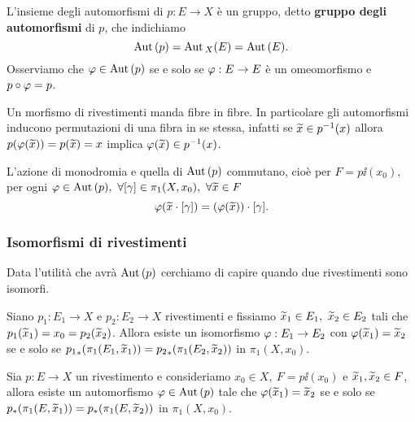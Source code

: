 \begin{multicols*}{2}
\begin{definition}
L'insieme degli automorfismi di $p:E\to X$ \`e un gruppo, detto \textbf{gruppo degli automorfismi} di $p$, che indichiamo
\[\mathrm{Aut}\,(p)=\mathrm{Aut}\,_X(E)=\mathrm{Aut}\,(E).\]
Osserviamo che $\varphi\in \mathrm{Aut}\,(p)$ se e solo se $\varphi:E\to E$ \`e un omeomorfismo e $p\circ \varphi=p$.
\end{definition}
\begin{remark}
Un morfismo di rivestimenti manda fibre in fibre. In particolare gli automorfismi inducono permutazioni di una fibra in se stessa, infatti se $\widetilde{x}\in p^{-1}(x)$ allora $p(\varphi(\widetilde{x}))=p(\widetilde{x})=x$ implica $\varphi(\widetilde{x})\in p^{-1}(x)$.
\end{remark}

\begin{proposition}\label{AzioneDiAutomorfismiEMonodromiaCommutano}
L'azione di monodromia e quella di $\mathrm{Aut}\,(p)$ commutano, cio\`e per $F=p\ii(x_0)$, per ogni $\varphi\in \mathrm{Aut}\,(p),\ \forall [\gamma]\in\pi_1(X,x_0),\ \forall \widetilde{x}\in F$
\[\varphi(\widetilde{x}\cdot[\gamma])=(\varphi(\widetilde{x}))\cdot [\gamma].\]
\end{proposition}


\subsubsection{Isomorfismi di rivestimenti}
Data l'utilit\`a che avr\`a $\mathrm{Aut}\,(p)$ cerchiamo di capire quando due rivestimenti sono isomorfi.

\begin{theorem}\label{CaratterizzazioneRivestimentiIsomorfiFissatoPunto}
Siano $p_1:E_1\to X$ e $p_2:E_2\to X$ rivestimenti e fissiamo $\widetilde{x}_1\in E_1,\ \widetilde{x}_2\in E_2$ tali che $p_1(\widetilde{x}_1)=x_0=p_2(\widetilde{x}_2)$. Allora esiste un isomorfismo $\varphi:E_1\to E_2$ con $\varphi(\widetilde{x}_1)=\widetilde{x}_2$ se e solo se ${p_1}_\ast(\pi_1(E_1,\widetilde{x}_1))={p_2}_\ast(\pi_1(E_2,\widetilde{x}_2))$ in $\pi_1(X,x_0)$.
\end{theorem}

\begin{corollary}\label{CriterioEsistenzaAutomorfismo}
Sia $p:E\to X$ un rivestimento e consideriamo $x_0\in X,\ F=p\ii(x_0)$ e $\widetilde{x}_1,\widetilde{x}_2\in F$, allora esiste un automorfismo $\varphi\in\mathrm{Aut}\,(p)$ tale che $\varphi(\widetilde{x}_1)=\widetilde{x}_2$ se e solo se ${p}_\ast(\pi_1(E,\widetilde{x}_1))={p}_\ast(\pi_1(E,\widetilde{x}_2))$ in $\pi_1(X,x_0)$.
\end{corollary}




\end{multicols*}
